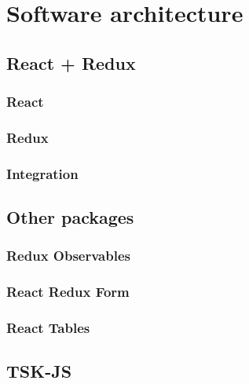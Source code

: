 \chapter{Software architecture}




\section{React + Redux}

\subsection{React}

\subsection{Redux}

\subsection{Integration}

\section{Other packages}

\subsection{Redux Observables}

\subsection{React Redux Form}

\subsection{React Tables}

\section{TSK-JS}

